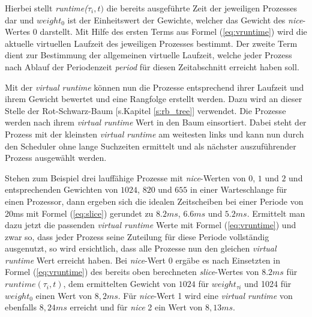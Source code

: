 Hierbei stellt \textit{runtime($\tau_{i},t)$} die bereits ausgeführte Zeit der jeweiligen Prozesses dar und \textit{$weight_{0}$} ist der Einheitswert der Gewichte, welcher das Gewicht des \textit{nice}-Wertes 0 darstellt.  
Mit Hilfe des ersten Terms aus Formel (\ref{eq:vruntime}) wird die aktuelle virtuellen Laufzeit des jeweiligen Prozesses bestimmt. Der zweite Term dient zur Bestimmung der allgemeinen virtuelle Laufzeit, welche jeder Prozess nach Ablauf der Periodenzeit \textit{period} für diesen Zeitabschnitt erreicht haben soll. 

Mit der \textit{virtual runtime} können nun die Prozesse entsprechend ihrer Laufzeit und ihrem Gewicht bewertet und eine Rangfolge erstellt werden. Dazu wird an dieser Stelle der Rot-Schwarz-Baum [s.Kapitel \ref{s:rb_tree}] verwendet. Die Prozesse werden nach ihrem \textit{virtual runtime} Wert in den Baum einsortiert. Dabei steht der Prozess mit der kleinsten \textit{virtual runtime} am weitesten links und kann nun durch den Scheduler ohne lange Suchzeiten ermittelt und als nächster auszuführender Prozess ausgewählt werden. 

Stehen zum Beispiel drei lauffähige Prozesse  mit \textit{nice}-Werten von  $0$, $1$ und $2$ und entsprechenden Gewichten von $1024$, $820$ und $655$ in einer Warteschlange für einen Prozessor, dann ergeben sich die idealen Zeitscheiben bei einer Periode von 20ms mit Formel (\ref{eq:slice}) gerundet zu $8.2ms$, $6.6ms$ und $5.2ms$.
Ermittelt man dazu jetzt die passenden \textit{virtual runtime} Werte mit Formel (\ref{eq:vruntime}) und zwar so, dass jeder Prozess seine Zuteilung für diese Periode vollständig ausgenutzt, so wird ersichtlich, dass alle Prozesse nun den gleichen \textit{virtual runtime} Wert erreicht haben.
Bei \textit{nice}-Wert 0 ergäbe es nach Einsetzten in Formel (\ref{eq:vruntime}) des bereits oben berechneten \textit{slice}-Wertes von $8.2ms$ für  $runtime(\tau_{i},t)$, dem ermittelten Gewicht von $1024$ für $weight_{\tau i}$ und 1024 für $weight_{0}$ einen Wert von $8,2ms$.
Für \textit{nice}-Wert 1 wird eine \textit{virtual runtime} von ebenfalls $8,24ms$ erreicht und für \textit{nice} 2 ein Wert von $8,13ms$. 

